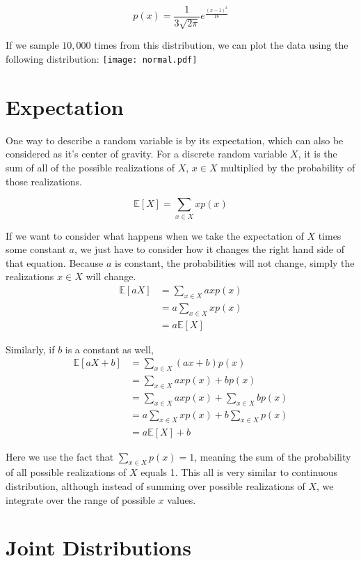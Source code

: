 \documentclass{article} %
\newcommand{\E}{\mathbb{E}}    %
\begin{document}
\[
p(x) = \frac{1}{3\sqrt{2\pi}} e^{\frac{(x - 1)^2}{18}}
\]

If we sample $10,000$ times from this distribution, we can plot the data using the following distribution:
\texttt{[image: normal.pdf]}

\section{Expectation}

One way to describe a random variable is by its expectation, which can also be considered as it's center of gravity. For a discrete random variable $X$, it is the sum of all of the possible realizations of $X$, $x \in X$ multiplied by the probability of those realizations.

\[
\E[X] = \sum_{x \in X} x p(x)
\]

If we want to consider what happens when we take the expectation of $X$ times some constant $a$, we just have to consider how it changes the right hand side of that equation. Because $a$ is constant, the probabilities will not change, simply the realizations $x\in X$ will change.
\begin{align*}
	\E[aX] &= \sum_{x \in X} ax p(x) \\
	&= a \sum_{x \in X} x p(x) \\
	&= a \E[X]
\end{align*}

Similarly, if $b$ is a constant as well,
\begin{align*}
	\E[aX + b] &= \sum_{x \in X} (ax + b) p(x) \\
	&= \sum_{x \in X} ax p(x) + b p(x) \\
	&= \sum_{x \in X} ax p(x) + \sum_{x \in X} b p(x) \\
	&= a \sum_{x \in X} x p(x) + b \sum_{x \in X} p(x) \\
	&= a \E[X] + b
\end{align*}

Here we use the fact that $\sum_{x \in X} p(x) = 1$, meaning the sum of the probability of all possible realizations of $X$ equals 1. This all is very similar to continuous distribution, although instead of summing over possible realizations of $X$, we integrate over the range of possible $x$ values.

\section{Joint Distributions}
\end{document}
